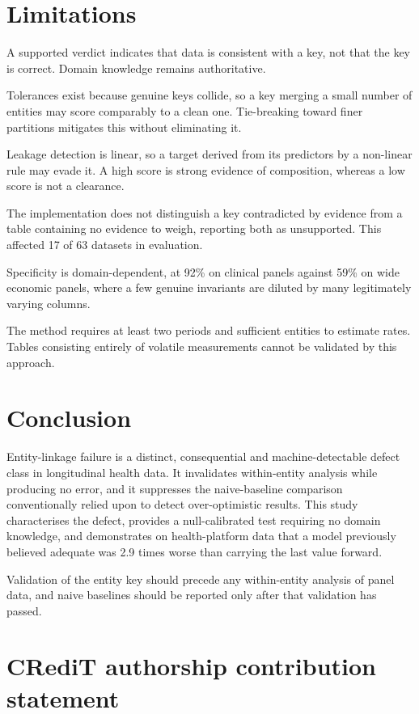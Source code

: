 \documentclass[preprint,12pt]{elsarticle}
\begin{document}
\section{Limitations}

A supported verdict indicates that data is consistent with a key, not that the
key is correct. Domain knowledge remains authoritative.

Tolerances exist because genuine keys collide, so a key merging a small number
of entities may score comparably to a clean one. Tie-breaking toward finer
partitions mitigates this without eliminating it.

Leakage detection is linear, so a target derived from its predictors by a
non-linear rule may evade it. A high score is strong evidence of composition,
whereas a low score is not a clearance.

The implementation does not distinguish a key contradicted by evidence from a
table containing no evidence to weigh, reporting both as unsupported. This
affected 17 of 63 datasets in evaluation.

Specificity is domain-dependent, at 92\% on clinical panels against 59\% on wide
economic panels, where a few genuine invariants are diluted by many legitimately
varying columns.

The method requires at least two periods and sufficient entities to estimate
rates. Tables consisting entirely of volatile measurements cannot be validated
by this approach.

\section{Conclusion}

Entity-linkage failure is a distinct, consequential and machine-detectable
defect class in longitudinal health data. It invalidates within-entity analysis
while producing no error, and it suppresses the naive-baseline comparison
conventionally relied upon to detect over-optimistic results. This study
characterises the defect, provides a null-calibrated test requiring no domain
knowledge, and demonstrates on health-platform data that a model previously
believed adequate was 2.9 times worse than carrying the last value forward.

Validation of the entity key should precede any within-entity analysis of panel
data, and naive baselines should be reported only after that validation has
passed.

\section*{CRediT authorship contribution statement}
\end{document}
